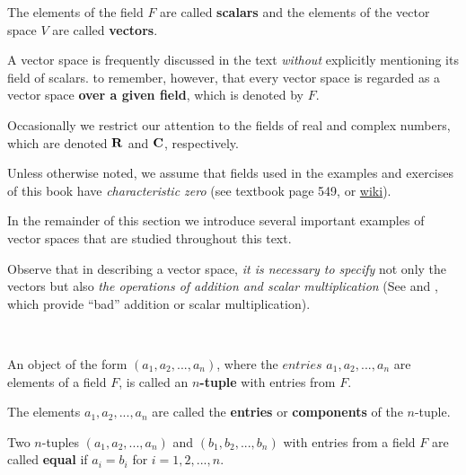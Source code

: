 \begin{note}
The elements of the field \(F\) are called \textbf{scalars} and the elements of the vector space \(V\) are called \textbf{vectors}.
\end{note}

\begin{remark}
A vector space is frequently discussed in the text \emph{without} explicitly mentioning its field of scalars.
 to remember, however, that every vector space is regarded as a vector space \textbf{over a given field}, which
is denoted by \(F\).

Occasionally we restrict our attention to the fields of real and complex numbers, which are denoted \(\mathbf{R}\) and \(\mathbf{C}\), respectively.
\end{remark}

\begin{remark}
Unless otherwise noted, we assume that fields used in the examples and exercises of this book have \emph{characteristic zero} (see textbook page 549, or \href{https://www.wikiwand.com/en/Characteristic_(algebra)}{wiki}).
\end{remark}

In the remainder of this section we introduce several important examples of vector spaces that are studied throughout this text.

\begin{remark}
Observe that in describing a vector space, \textit{it is necessary to specify} not only the vectors but also \textit{the operations of addition and scalar multiplication} (See  and , which provide ``bad'' addition or scalar multiplication).
\end{remark}

\begin{additional definition} \label{adef 1.1} \ 

 An object of the form \((a_1, a_2, ..., a_n)\), where the \(entries\) \(a_1, a_2, ..., a_n\) are elements of a field \(F\), is called an \textbf{\(n\)-tuple} with entries from \(F\).

 The elements \(a_1, a_2, ..., a_n\) are called the \textbf{entries} or \textbf{components} of the \(n\)-tuple.

 Two \(n\)-tuples \((a_1, a_2, ..., a_n)\) and \((b_1, b_2, ..., b_n)\) with entries from a field \(F\) are called \textbf{equal} if \(a_i = b_i\) for \(i = 1, 2, ..., n\).
\end{additional definition}


